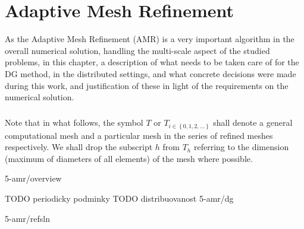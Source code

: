 \chapter{Adaptive Mesh Refinement}
As the Adaptive Mesh Refinement (AMR) is a very important algorithm in the overall numerical solution, handling the multi-scale aspect of the studied problems, in this chapter, a description of what needs to be taken care of for the DG method, in the distributed settings, and what concrete decisions were made during this work, and justification of these in light of the requirements on the numerical solution.
\paragraph{}
Note that in what follows, the symbol $T$ or $T_{i\in\left\{0, 1, 2, ...\right\}}$ shall denote a general computational mesh and a particular mesh in the series of refined meshes respectively. We shall drop the subscript $h$ from $T_h$ referring to the dimension (maximum of diameters of all elements) of the mesh where possible.

 {5-amr/overview}

TODO periodicky podminky
TODO distribuovanost
 {5-amr/dg}

 {5-amr/refsln}
